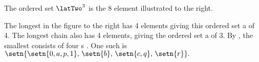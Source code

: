 \begin{minipage}{\tw-35mm}
\begin{example}
The ordered set $\latTwo^3$ is the 8 element  illustrated to the right.
\end{example}
\end{minipage}%
\begin{minipage}{3\tw/16}\center%
\end{minipage}





\begin{minipage}{\tw-55mm}%
\begin{example}
\footnotemark
The longest   in the figure to the right has 4 elements
giving this ordered set a   of 4.
The longest chain also has 4 elements, giving the ordered set a   of 3.
By  , the smallest  consists of four s .
One such  is
  \\\indentx$\setn{\setn{0,a,p,1},\,\setn{b},\,\setn{c,q},\,\setn{r}}.$
\end{example}
\end{minipage}%
%
\hfill{}%

